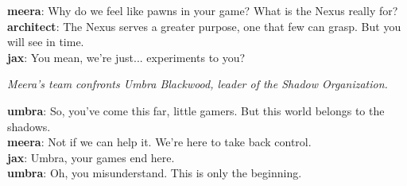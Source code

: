 \documentclass[12pt]{book}
\begin{document}
\textbf{meera}: Why do we feel like pawns in your game? What is the Nexus really for?\\

\textbf{architect}: The Nexus serves a greater purpose, one that few can grasp. But you will see in time.\\

\textbf{jax}: You mean, we're just... experiments to you?\\

\vspace{1em}

\textit{Meera's team confronts Umbra Blackwood, leader of the Shadow Organization.}

\textbf{umbra}: So, you've come this far, little gamers. But this world belongs to the shadows.\\

\textbf{meera}: Not if we can help it. We're here to take back control.\\

\textbf{jax}: Umbra, your games end here.\\

\textbf{umbra}: Oh, you misunderstand. This is only the beginning.\\

\vspace{1em}
\end{document}
